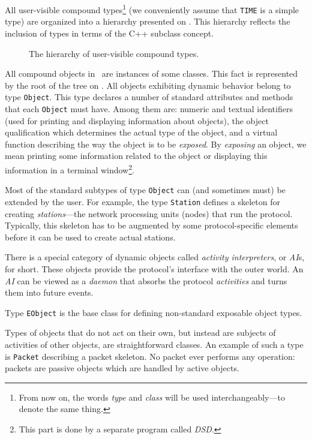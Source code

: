 All user-visible compound types\footnote{From now on, the words
{\em type\/} and {\em class\/} will be used interchangeably---to denote the
same thing.} (we conveniently assume that
{\tt TIME} is a simple type) are organized into a hierarchy presented on
.
This hierarchy reflects the inclusion of types in terms of the C++ subclass
concept.

\begin{figure}[htbp]
	\begin{center}
		
		\usebox{\graph}
		\vspace{0.75cm}
\caption{ The hierarchy of user-visible compound types.  \label{fig.hot}}
	\end{center}
\end{figure}

All compound objects in \smurph\ are instances of some classes.
This fact is represented by the root of the tree on .
All objects exhibiting dynamic behavior belong to type {\tt Object}.
This type declares a number of standard attributes and methods
that each {\tt Object} must have.
Among them are: numeric and textual identifiers
(used for printing and displaying information about objects), 
the object qualification which determines the actual type of the object,
and a virtual function describing the way the object is to be {\em exposed}.
By {\em exposing\/} an object, we mean printing some information related
to the object or displaying this information in a
terminal window\footnote{This part is done by a separate program called
{\em DSD}.}.

Most of the standard subtypes of type {\tt Object} can (and sometimes must)
be extended by the user.
For example, the type {\tt Station} defines a skeleton for creating
{\em stations\/}---the network processing units (nodes) that run the protocol.
Typically, this skeleton has to be augmented by some protocol-specific
elements before it can be used to create actual stations.

There is a special category of dynamic objects called
{\em activity interpreters}, or {\em AI\/}s, for short.
These objects provide the protocol's interface with the outer world.
An {\em AI\/} can be viewed as a {\em daemon\/} that absorbs the protocol
{\em activities\/} and turns them into future events.

Type {\tt EObject} is the base class for defining non-standard
exposable object types.

Types of objects that do not act on their own,
but instead are subjects of activities of other objects,
are straightforward classes.
An example of such a type is {\tt Packet} describing a packet skeleton.
No packet ever performs any operation: packets are passive
objects which are handled by active objects.


